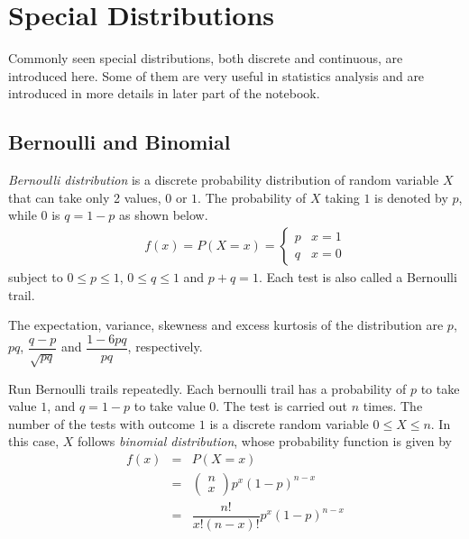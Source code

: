 \chapter{Special Distributions} \label{ch:commondistribution}

Commonly seen special distributions, both discrete and continuous, are introduced here. Some of them are very useful in statistics analysis and are introduced in more details in later part of the notebook.

\section{Bernoulli and Binomial}

\textit{Bernoulli distribution} is a discrete probability distribution of random variable $X$ that can take only 2 values, $0$ or $1$. The probability of $X$ taking $1$ is denoted by $p$, while $0$ is $q=1-p$ as shown below.
\begin{eqnarray}
  && f(x) = P(X=x) = \left\{\begin{array}{cc}
                           p & x=1 \\
                           q & x=0
                         \end{array}\right. \nonumber
\end{eqnarray}
subject to $0\leq p \leq 1$, $0\leq q \leq 1$ and $p+q=1$. Each test is also called a Bernoulli trail.

The expectation, variance, skewness and excess kurtosis of the distribution are $p$, $pq$, $\dfrac{q-p}{\sqrt{pq}}$ and $\dfrac{1-6pq}{pq}$, respectively.

Run Bernoulli trails repeatedly. Each bernoulli trail has a probability of $p$ to take value $1$, and $q=1-p$ to take value $0$. The test is carried out $n$ times. The number of the tests with outcome $1$ is a discrete random variable $0\leq X \leq n$. In this case, $X$ follows \textit{binomial distribution}, whose probability function is given by
\begin{eqnarray}
  f(x) &=& P(X=x) \nonumber \\
  &=& \left(\begin{array}{c}
              n \\
              x
            \end{array}\right)p^x(1-p)^{n-x} \nonumber \\
  &=& \dfrac{n!}{x!(n-x)!}p^x(1-p)^{n-x}
\end{eqnarray}

